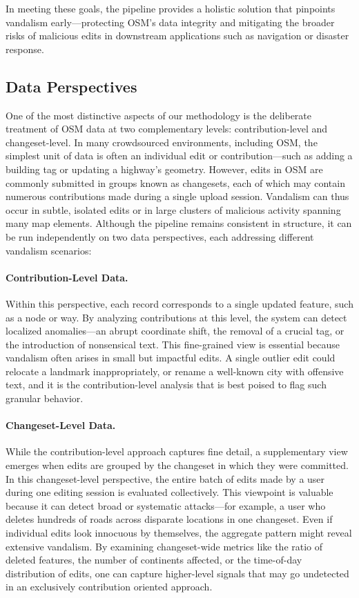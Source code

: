 \documentclass[
    13pt, %
    a4paper, %
    listof=totoc, %
    bibliography=totoc, %
    index=totoc, %
    headsepline
]{scrreprt}
\begin{document}
In meeting these goals, the pipeline provides a holistic solution that pinpoints vandalism early—protecting OSM’s data integrity and mitigating the broader risks of malicious edits in downstream applications such as navigation or disaster response.

\subsection{Data Perspectives}
\label{sec:data_perspectives}

\noindent
One of the most distinctive aspects of our methodology is the deliberate treatment of OSM data
at two complementary levels: contribution-level and changeset-level. In many crowdsourced
environments, including OSM, the simplest unit of data is often an individual edit or contribution—such as adding a building tag or updating a highway’s geometry. However, edits in OSM
are commonly submitted in groups known as changesets, each of which may contain numerous
contributions made during a single upload session. Vandalism can thus occur in subtle, isolated
edits or in large clusters of malicious activity spanning many map elements. Although the pipeline remains consistent in structure, it can be run independently on two data perspectives, each addressing different vandalism scenarios:

\paragraph{Contribution-Level Data.}
Within this perspective, each record corresponds to a single updated feature, such as a node or way. By analyzing contributions at this level, the system can detect localized anomalies—an abrupt coordinate shift, the removal of a crucial tag, or the introduction of nonsensical text. This fine-grained view is essential because vandalism often arises in small but impactful edits. A single outlier edit could relocate a landmark inappropriately, or rename a  well-known city with offensive text, and it is the contribution-level analysis that is best poised to flag such granular behavior.

\paragraph{Changeset-Level Data.}
While the contribution-level approach captures fine detail,
a supplementary view emerges when edits are grouped by the changeset in which they were
committed. In this changeset-level perspective, the entire batch of edits made by a user during
one editing session is evaluated collectively. This viewpoint is valuable because it can detect
broad or systematic attacks—for example, a user who deletes hundreds of roads across disparate
locations in one changeset. Even if individual edits look innocuous by themselves, the aggregate
pattern might reveal extensive vandalism. By examining changeset-wide metrics like the ratio
of deleted features, the number of continents affected, or the time-of-day distribution of edits,
one can capture higher-level signals that may go undetected in an exclusively contribution oriented approach.
\end{document}
